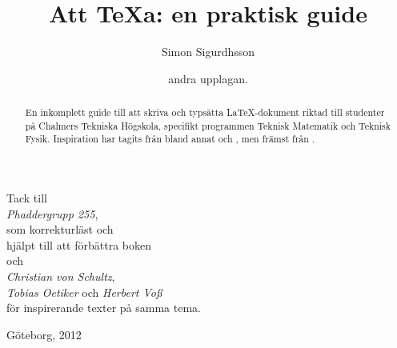 \documentclass[swe,10pt,nofont]{skrapport}
\title{Att \TeX{}a: en praktisk guide}
\author{Simon Sigurdhsson}
\date{andra upplagan.}
\makeatletter
\newcommand\frontmatter{%
  \cleardoublepage
  \pagenumbering{roman}}
\newcommand\mainmatter{%
  \cleardoublepage
  \pagenumbering{arabic}}
\renewenvironment{titlepage}{\cleardoublepage}{\thispagestyle{skrapport@titlepage}\cleardoublepage\setcounter{page}\@ne}
\let\@oldLaTeX\LaTeX
\def\LaTeX{\texorpdfstring{\@oldLaTeX}{LaTeX}}
\def\parsedate #1:2#2#3#4#5#6#7#8#9\empty{\ifx{#2}{9}19\else20\fi#3#4/#5#6/#7#8}
\newcommand\moddate[1][\jobname.tex]{\expandafter\parsedate\pdffilemoddate{#1}\empty}
\makeatother
\begin{document}
	\pagestyle{empty}
	
	\begin{titlepage} %
		\maketitle
		\begin{abstract}
			En inkomplett guide till att skriva och typsätta \LaTeX-dokument riktad
			till studenter på Chalmers Tekniska Högskola, specifikt programmen
			Teknisk Matematik och Teknisk Fysik.
			Inspiration har tagits från bland annat  och
			, men främst från .
		\end{abstract}
	\end{titlepage} %
	\cleardoublepage
	
	\begin{center} %
		\large\vspace*{36pt}
		
		{\makeatletter\@titstyle\makeatother\Large Tack till}\\[1ex]
		\emph{Phaddergrupp 255},\\
		som korrekturläst och\\
		hjälpt till att förbättra boken\\[1ex]
		{\makeatletter\@titstyle\makeatother\Large och}\\[1ex]
		\emph{Christian von Schultz},\\
		\emph{Tobias Oetiker} och \emph{Herbert Voß}\\
		för inspirerande texter på samma tema.
		\vfill 
		
		\small
		Göteborg, 2012
	\end{center}
	\cleardoublepage 
	
	\frontmatter
	\pagestyle{thefancy}
	\tableofcontents
	\cleardoublepage
	
	\mainmatter
\end{document}
